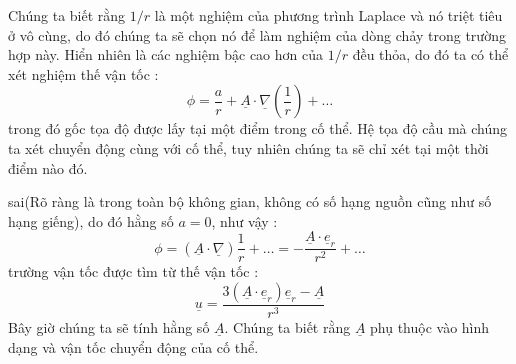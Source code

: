 \documentclass[CO_LUU_CHAT.tex]{subfiles}
\begin{document}
Chúng ta biết rằng $1/r$ là một nghiệm của phương trình Laplace và nó triệt tiêu ở vô cùng, do đó chúng ta sẽ chọn nó để làm nghiệm của dòng chảy trong trường hợp này. Hiển nhiên là các nghiệm bậc cao hơn của $1/r$ đều thỏa, do đó ta có thể xét nghiệm thế vận tốc :
$$
\phi=\frac{a}{r}+\underline{A}\cdot\underline{\nabla}\left(\frac{1}{r}\right)+\dots
$$
trong đó gốc tọa độ được lấy tại một điểm trong cố thể. Hệ tọa độ cầu mà chúng ta xét chuyển động cùng với cố thể, tuy nhiên chúng ta sẽ chỉ xét tại một thời điểm nào đó.

sai(Rõ ràng là trong toàn bộ không gian, không có số hạng nguồn cũng như số hạng giếng), do đó hằng số $a=0$, như vậy :
$$
\phi=\left(\underline{A}\cdot\underline{\nabla}\right)\frac{1}{r}+\dots=-\frac{\underline{A}\cdot\underline{e}_r}{r^2}+\dots
$$
trường vận tốc được tìm từ thế vận tốc :
$$
\underline{u}=\frac{3\left(\underline{A}\cdot\underline{e}_r\right)\underline{e}_r-\underline{A}}{r^3}
$$
Bây giờ chúng ta sẽ tính hằng số $\underline{A}$. Chúng ta biết rằng $\underline{A}$ phụ thuộc vào hình dạng và vận tốc chuyển động của cố thể.
\end{document}
